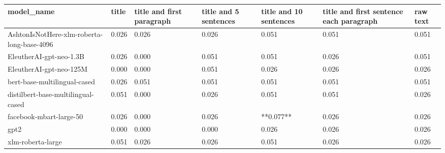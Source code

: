\begin{tabular}{lllllll}
\toprule
                                model\_name & title & title and first paragraph & title and 5 sentences & title and 10 sentences & title and first sentence each paragraph & raw text \\
\midrule
AshtonIsNotHere-xlm-roberta-long-base-4096 & 0.026 &                     0.026 &                 0.026 &                  0.051 &                                   0.051 &    0.051 \\
                   EleutherAI-gpt-neo-1.3B & 0.026 &                     0.000 &                 0.051 &                  0.051 &                                   0.026 &    0.051 \\
                   EleutherAI-gpt-neo-125M & 0.000 &                     0.000 &                 0.051 &                  0.026 &                                   0.026 &    0.026 \\
              bert-base-multilingual-cased & 0.026 &                     0.051 &                 0.051 &                  0.051 &                                   0.051 &    0.051 \\
        distilbert-base-multilingual-cased & 0.051 &                     0.000 &                 0.026 &                  0.051 &                                   0.051 &    0.026 \\
                   facebook-mbart-large-50 & 0.026 &                     0.000 &                 0.026 &              **0.077** &                                   0.026 &    0.026 \\
                                      gpt2 & 0.000 &                     0.000 &                 0.000 &                  0.026 &                                   0.026 &    0.026 \\
                         xlm-roberta-large & 0.051 &                     0.026 &                 0.026 &                  0.051 &                                   0.026 &    0.026 \\
\bottomrule
\end{tabular}
